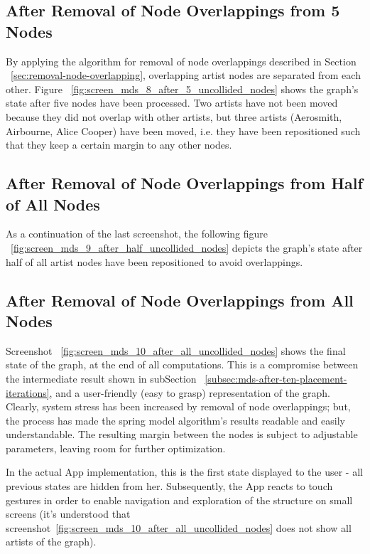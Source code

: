 \subsection{After Removal of Node Overlappings from 5 Nodes}

By applying the algorithm for removal of node overlappings described in Section ~\ref{sec:removal-node-overlapping}, overlapping artist nodes are separated from each other. Figure ~\ref{fig:screen_mds_8_after_5_uncollided_nodes} shows the graph's state after five nodes have been processed. Two artists have not been moved because they did not overlap with other artists, but three artists (Aerosmith, Airbourne, Alice Cooper) have been moved, i.e. they have been repositioned such that they keep a certain margin to any other nodes.

\subsection{After Removal of Node Overlappings from Half of All Nodes}

As a continuation of the last screenshot, the following figure ~\ref{fig:screen_mds_9_after_half_uncollided_nodes} depicts the graph's state after half of all artist nodes have been repositioned to avoid overlappings.

\subsection{After Removal of Node Overlappings from All Nodes}

Screenshot ~\ref{fig:screen_mds_10_after_all_uncollided_nodes} shows the final state of the graph, at the end of all computations. This is a compromise between the intermediate result shown in subSection ~\ref{subsec:mds-after-ten-placement-iterations}, and a user-friendly (easy to grasp) representation of the graph. Clearly, system stress has been increased by removal of node overlappings; but, the process has made the spring model algorithm's results readable and easily understandable. The resulting margin between the nodes is subject to adjustable parameters, leaving room for further optimization.

In the actual App implementation, this is the first state displayed to the user - all previous states are hidden from her. Subsequently, the App reacts to touch gestures in order to enable navigation and exploration of the structure on small screens (it's understood that screenshot~\ref{fig:screen_mds_10_after_all_uncollided_nodes} does not show all artists of the graph).


